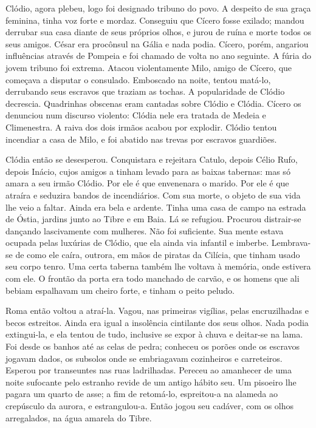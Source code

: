 Clódio, agora plebeu, logo foi designado tribuno do povo. A despeito de sua
graça feminina, tinha voz forte e mordaz. Conseguiu que Cícero fosse
exilado; mandou derrubar sua casa diante de seus próprios olhos, e jurou
de ruína e morte todos os seus amigos. César era procônsul na Gália e nada
podia. Cícero, porém, angariou influências através de Pompeia e foi
chamado de volta no ano seguinte. A fúria do jovem tribuno foi extrema.
Atacou violentamente Milo, amigo de Cícero, que começava a disputar o
consulado. Emboscado na noite, tentou matá-lo, derrubando seus escravos
que traziam as tochas. A popularidade de Clódio decrescia. Quadrinhas
obscenas eram cantadas sobre Clódio e Clódia. Cícero os denunciou num
discurso violento: Clódia nele era tratada de Medeia e Climenestra. A
raiva dos dois irmãos acabou por explodir. Clódio tentou incendiar a casa
de Milo, e foi abatido nas trevas por escravos guardiões.

Clódia então se desesperou. Conquistara e rejeitara Catulo, depois Célio
Rufo, depois Inácio, cujos amigos a tinham levado para as baixas tabernas:
mas só amara a seu irmão Clódio. Por ele é que envenenara o marido. Por
ele é que atraíra e seduzira bandos de incendiários. Com sua morte, o
objeto de sua vida lhe veio a faltar. Ainda era bela e ardente. Tinha uma
casa de campo na estrada de Óstia, jardins junto ao Tibre e em Baia. Lá se
refugiou. Procurou distrair-se dançando lascivamente com mulheres. Não foi
suficiente. Sua mente estava ocupada pelas luxúrias de Clódio, que ela
ainda via infantil e imberbe. Lembrava-se de como ele caíra, outrora, em
mãos de piratas da Cilícia, que tinham usado seu corpo tenro. Uma certa
taberna também lhe voltava à memória, onde estivera com ele. O frontão da
porta era todo manchado de carvão, e os homens que ali bebiam espalhavam
um cheiro forte, e tinham o peito peludo.

Roma então voltou a atraí-la. Vagou, nas primeiras vigílias, pelas
encruzilhadas e becos estreitos. Ainda era igual a insolência cintilante
dos seus olhos. Nada podia extingui-la, e ela tentou de tudo, inclusive se
expor à chuva e deitar-se na lama. Foi desde os banhos até as celas de
pedra; conheceu os porões onde os escravos jogavam dados, os subsolos onde
se embriagavam cozinheiros e carreteiros. Esperou por transeuntes nas ruas
ladrilhadas. Pereceu ao amanhecer de uma noite sufocante pelo estranho
revide de um antigo hábito seu. Um pisoeiro lhe pagara um quarto de asse;
a fim de retomá-lo, espreitou-a na alameda ao crepúsculo da aurora, e
estrangulou-a. Então jogou seu cadáver, com os olhos arregalados, na água
amarela do Tibre.

